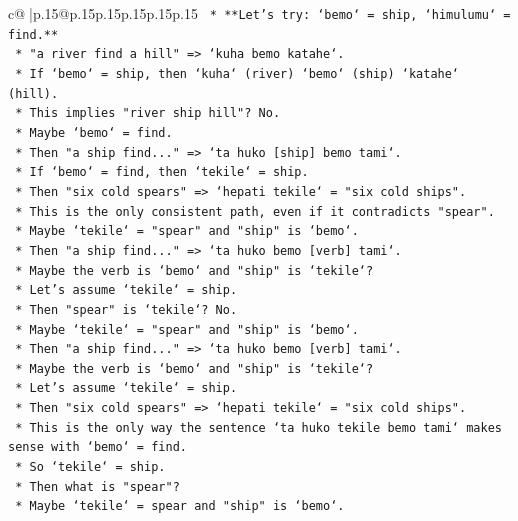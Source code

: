 \documentclass{article}
\begin{document}
{\begin{supertabular}{c@{$\;$}|p{.15\linewidth}@{}p{.15\linewidth}p{.15\linewidth}p{.15\linewidth}p{.15\linewidth}p{.15\linewidth}}
{{{\texttt{    *   **Let's try: `bemo` = ship, `himulumu` = find.**} \\
\texttt{        *   "a river find a hill" => `kuha bemo katahe`.} \\
\texttt{            *   If `bemo` = ship, then `kuha` (river) `bemo` (ship) `katahe` (hill).} \\
\texttt{            *   This implies "river ship hill"? No.} \\
\texttt{            *   Maybe `bemo` = find.} \\
\texttt{            *   Then "a ship find..." => `ta huko {[}ship{]} bemo tami`.} \\
\texttt{            *   If `bemo` = find, then `tekile` = ship.} \\
\texttt{            *   Then "six cold spears" => `hepati tekile` = "six cold ships".} \\
\texttt{            *   This is the only consistent path, even if it contradicts "spear".} \\
\texttt{            *   Maybe `tekile` = "spear" and "ship" is `bemo`.} \\
\texttt{            *   Then "a ship find..." => `ta huko bemo {[}verb{]} tami`.} \\
\texttt{            *   Maybe the verb is `bemo` and "ship" is `tekile`?} \\
\texttt{            *   Let's assume `tekile` = ship.} \\
\texttt{            *   Then "spear" is `tekile`? No.} \\
\texttt{            *   Maybe `tekile` = "spear" and "ship" is `bemo`.} \\
\texttt{            *   Then "a ship find..." => `ta huko bemo {[}verb{]} tami`.} \\
\texttt{            *   Maybe the verb is `bemo` and "ship" is `tekile`?} \\
\texttt{            *   Let's assume `tekile` = ship.} \\
\texttt{            *   Then "six cold spears" => `hepati tekile` = "six cold ships".} \\
\texttt{            *   This is the only way the sentence `ta huko tekile bemo tami` makes sense with `bemo` = find.} \\
\texttt{            *   So `tekile` = ship.} \\
\texttt{            *   Then what is "spear"?} \\
\texttt{            *   Maybe `tekile` = spear and "ship" is `bemo`.} \\
}}}
\end{supertabular}}
\end{document}
